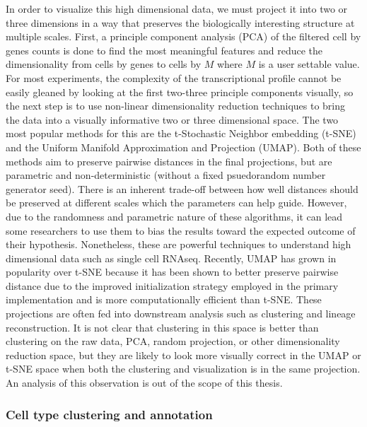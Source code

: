 \par{
In order to visualize this high dimensional data, we must project it into two or three dimensions in a way that preserves the biologically interesting structure at multiple scales. First, a principle component analysis (PCA) of the filtered cell by genes counts is done to find the most meaningful features and reduce the dimensionality from cells by genes to cells by $M$ where $M$ is a user settable value\cite{pcaimpl}. For most experiments, the complexity of the transcriptional profile cannot be easily gleaned by looking at the first two-three principle components visually, so the next step is to use non-linear dimensionality reduction techniques to bring the data into a visually informative two or three dimensional space. The two most popular methods for this are the t-Stochastic Neighbor embedding (t-SNE)\cite{tsne1}\cite{tsne2}\cite{hinton} and the Uniform Manifold Approximation and Projection (UMAP)\cite{umap1}. Both of these methods aim to preserve pairwise distances in the final projections, but are parametric and non-deterministic (without a fixed psuedorandom number generator seed). There is an inherent trade-off between how well distances should be preserved at different scales which the parameters can help guide. However, due to the randomness and parametric nature of these algorithms, it can lead some researchers to use them to bias the results toward the expected outcome of their hypothesis. Nonetheless, these are powerful techniques to understand high dimensional data such as single cell RNAseq. Recently, UMAP has grown in popularity over t-SNE because it has been shown to better preserve pairwise distance due to the improved initialization strategy employed in the primary implementation and is more computationally efficient than t-SNE\cite{umap2}\cite{umap3}. These projections are often fed into downstream analysis such as clustering and lineage reconstruction. It is not clear that clustering in this space is better than clustering on the raw data, PCA, random projection\cite{randomproject}, or other dimensionality reduction space, but they are likely to look more visually correct in the UMAP or t-SNE space when both the clustering and visualization is in the same projection. An analysis of this observation is out of the scope of this thesis.
}


\subsubsection{Cell type clustering and annotation}


